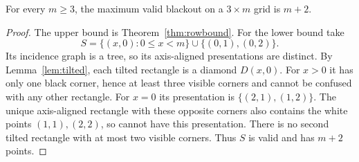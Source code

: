 \begin{theorem}\label{thm:threerow}
For every $m\ge3$, the maximum valid blackout on a $3\times m$ grid is $m+2$.
\end{theorem}
\begin{proof}
The upper bound is Theorem~\ref{thm:rowbound}. For the lower bound take
\[
S=\{(x,0):0\le x<m\}\cup\{(0,1),(0,2)\}.
\]
Its incidence graph is a tree, so its axis-aligned presentations are distinct.
By Lemma~\ref{lem:tilted}, each tilted rectangle is a diamond $D(x,0)$.
For $x>0$ it has only one black corner, hence at least three visible corners
and cannot be confused with any other rectangle. For $x=0$ its presentation
is $\{(2,1),(1,2)\}$. The unique axis-aligned rectangle with these opposite
corners also contains the white points $(1,1),(2,2)$, so cannot have this
presentation. There is no second tilted rectangle with at most two visible
corners. Thus $S$ is valid and has $m+2$ points.
\end{proof}

